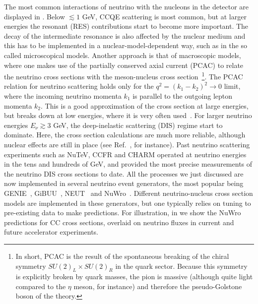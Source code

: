 The most common interactions of neutrino with the nucleons in the detector are displayed in . Below $\lesssim1$ GeV, CCQE scattering is most common, but at larger energies the resonant (RES) contributions start to become more important. The decay of the intermediate resonance is also affected by the nuclear medium and this has to be implemented in a nuclear-model-dependent way, such as in the so called microscopical models. Another approach is that of macroscopic models, where one makes use of the partially conserved axial current (PCAC) to relate the neutrino cross sections with the meson-nucleus cross section~\footnote{In short, PCAC is the result of the spontaneous breaking of the chiral symmetry $SU(2)_L \times SU(2)_R$ in the quark sector. Because this symmetry is explicitly broken by quark masses, the pion is massive (although quite light compared to the $\eta$ meson, for instance) and therefore the pseudo-Golstone boson of the theory.}. The PCAC relation for neutrino scattering holds only for the $q^2 = (k_1 - k_2)^2 \to 0$ limit, where the incoming neutrino momenta $k_1$ is parallel to the outgoing lepton momenta $k_2$. This is a good approximation of the cross section at large energies, but breaks down at low energies, where it is very often used~\cite{Hernandez:2009vm}. For larger neutrino energies $E_\nu\gtrsim 3$ GeV, the deep-inelastic scattering (DIS) regime start to dominate. Here, the cross section calculations are much more reliable, although nuclear effects are still in place (see Ref.~\cite{}, for instance). Past neutrino scattering experiments such as NuTeV, CCFR and CHARM operated at neutrino energies in the tens and hundreds of GeV, and provided the most precise measurements of the neutrino DIS cross sections to date. All the processes we just discussed are now  implemented in several neutrino event generators, the most popular being GENIE~\cite{Andreopoulos:2009rq}, GiBUU~\cite{Buss:2011mx}, NEUT~\cite{Hayato:2002sd} and NuWro~\cite{Juszczak:2005zs}. Different neutrino-nucleus cross section models are implemented in these generators, but one typically relies on tuning to pre-existing data to make predictions. For illustration, in  we show the NuWro predictions for CC cross sections, overlaid on neutrino fluxes in current and future accelerator experiments.





